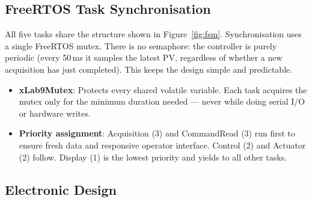 \documentclass[12pt]{article}
\begin{document}
\subsection{FreeRTOS Task Synchronisation}

All five tasks share the structure shown in Figure~\ref{fig:fsm}. Synchronisation uses a single FreeRTOS mutex. There is no semaphore: the controller is purely periodic (every 50\,ms it samples the latest PV, regardless of whether a new acquisition has just completed). This keeps the design simple and predictable.

\begin{itemize}
  \item \textbf{xLab9Mutex}: Protects every shared volatile variable. Each task acquires the mutex only for the minimum duration needed --- never while doing serial I/O or hardware writes.
  \item \textbf{Priority assignment}: Acquisition (3) and CommandRead (3) run first to ensure fresh data and responsive operator interface. Control (2) and Actuator (2) follow. Display (1) is the lowest priority and yields to all other tasks.
\end{itemize}

\subsection{Electronic Design}
\end{document}
